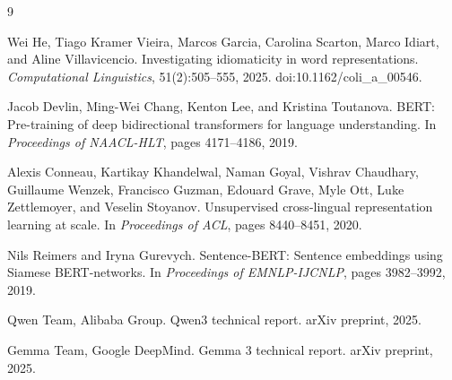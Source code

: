 \documentclass[11pt]{article}
\begin{document}
\begin{thebibliography}{9}

Wei He, Tiago Kramer Vieira, Marcos Garcia, Carolina Scarton, Marco Idiart, and Aline
Villavicencio.
\newblock Investigating idiomaticity in word representations.
\newblock \emph{Computational Linguistics}, 51(2):505--555, 2025.
\newblock doi:10.1162/coli\_a\_00546.

Jacob Devlin, Ming-Wei Chang, Kenton Lee, and Kristina Toutanova.
\newblock BERT: Pre-training of deep bidirectional transformers for language understanding.
\newblock In \emph{Proceedings of NAACL-HLT}, pages 4171--4186, 2019.

Alexis Conneau, Kartikay Khandelwal, Naman Goyal, Vishrav Chaudhary, Guillaume Wenzek,
Francisco Guzman, Edouard Grave, Myle Ott, Luke Zettlemoyer, and Veselin Stoyanov.
\newblock Unsupervised cross-lingual representation learning at scale.
\newblock In \emph{Proceedings of ACL}, pages 8440--8451, 2020.

Nils Reimers and Iryna Gurevych.
\newblock Sentence-BERT: Sentence embeddings using Siamese BERT-networks.
\newblock In \emph{Proceedings of EMNLP-IJCNLP}, pages 3982--3992, 2019.

Qwen Team, Alibaba Group.
\newblock Qwen3 technical report.
\newblock arXiv preprint, 2025.

Gemma Team, Google DeepMind.
\newblock Gemma 3 technical report.
\newblock arXiv preprint, 2025.

\end{thebibliography}
\end{document}
